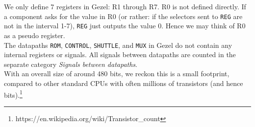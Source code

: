 We only define 7 registers in Gezel: R1 through R7. R0 is not defined directly. If a component asks for the value in R0 (or rather: if the selectors sent to \texttt{REG} are not in the interval 1-7), \texttt{REG} just outputs the value 0. Hence we may think of R0 as a pseudo register.\\

The datapaths \texttt{ROM}, \texttt{CONTROL}, \texttt{SHUTTLE}, and \texttt{MUX} in Gezel do not contain any internal registers or signals. All signals between datapaths are counted in the separate category \textit{Signals between datapaths}.\\

With an overall size of around 480 bits, we reckon this is a small footprint, compared to other standard CPUs with often millions of transistors (and hence bits).\footnote{https://en.wikipedia.org/wiki/Transistor_count}